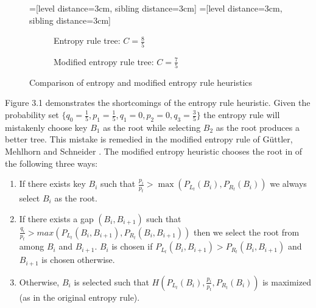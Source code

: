 \documentclass[letterpaper,12pt,titlepage,oneside,final]{book}
\theoremstyle{plain}
\begin{document}
\begin{figure}[H]
\centering
=[level distance=3cm, sibling distance=3cm]
=[level distance=3cm, sibling distance=3cm]
\scriptsize
\begin{subfigure}{.46\textwidth}
\centering
{}
\caption{Entropy rule tree: $C=\frac{8}{5}$}
\end{subfigure}
\begin{subfigure}{.46\textwidth}
\centering
{}
\caption{Modified entropy rule tree: $C=\frac{7}{5}$}
\end{subfigure}
\caption{Comparison of entropy and modified entropy rule heuristics}
\end{figure}

Figure 3.1 demonstrates the shortcomings of the entropy rule heuristic. Given the probability set $\{q_0 = \frac{1}{5}, p_1 = \frac{1}{5}, q_1 = 0, p_2 = 0, q_3 = \frac{3}{5}\}$ the entropy rule will mistakenly choose key $B_1$ as the root while selecting $B_2$ as the root produces a better tree. This mistake is remedied in the modified entropy rule of G{\"u}ttler, Mehlhorn and Schneider \cite{guttler1980binary}. The modified entropy heuristic chooses the root in of the following three ways:

\begin{enumerate}[label=\alph*)]
\item If there exists key $B_i$ such that $\frac{p_i}{p_t} > \max(P_{L_t}(B_i), P_{R_t}(B_i))$ we always select $B_i$ as the root.

\item If there exists a gap $(B_i, B_{i+1})$ such that $\frac{q_i}{p_t} > max(P_{L_t}(B_i, B_{i+1}), P_{R_t}(B_i, B_{i+1}))$ then we select the root from among $B_i$ and $B_{i+1}$. $B_i$ is chosen if $P_{L_t}(B_i, B_{i+1}) > P_{R_t}(B_i, B_{i+1})$ and $B_{i+1}$ is chosen otherwise.

\item Otherwise, $B_i$ is selected such that $H(P_{L_t}(B_i), \frac{p_i}{p_t}, P_{R_t}(B_i))$ is maximized (as in the original entropy rule).

\end{enumerate}
\end{document}
